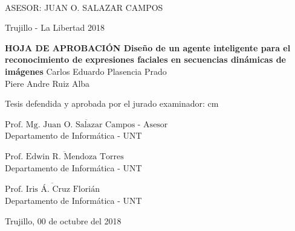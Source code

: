 \begin{center}
   {\bf {\fontsize{14}{16.8}\selectfont{CARLOS PLASENCIA PRADO}}}\\    
      {\bf {\fontsize{14}{16.8}\selectfont{PIERE RUIZ ALBA}}}       
   \end{center}   

\vskip 3.2cm
\begin{center}
   {\bf \doublespacing {\fontsize{17}{20.4}\selectfont{DISEÑO DE UN AGENTE INTELIGENTE PARA EL RECONOCIMIENTO DE EXPRESIONES FACIALES EN SECUENCIAS DINÁMICAS DE IMÁGENES}}}     
\end{center}   
  \vskip 2cm
\begin{verse}
 \fontsize{12}{14.4}
\end{verse}

\vskip 1.5cm 
{\fontsize{14}{16.8}\selectfont ASESOR: JUAN O. SALAZAR CAMPOS} 
 \vskip 1cm 
 \begin{center}    
 \vskip 1.5cm
{\fontsize{14}{16.8}\selectfont Trujillo - La Libertad
\vskip 0.1cm
\hspace*{-0.2cm} 
2018}
\end{center} 
\newpage


\begin{center}
 {\bf {\Large HOJA DE APROBACIÓN }     
 \vskip 1.5cm
  {\Large Diseño de un agente inteligente para el reconocimiento de expresiones faciales en secuencias dinámicas de imágenes}}
 \vskip 1cm 
  {\large{Carlos Eduardo Plasencia Prado}}\\
    {\large{Piere Andre Ruiz Alba}}

 \vskip 1cm
\end{center} 
Tesis defendida y aprobada por el jurado examinador:
 cm
\begin{flushleft} 
$\overline{\mbox{Prof. Mg. Juan O. Salazar Campos - Asesor}}$\\
\vskip -0.5cm
Departamento de Informática - UNT
\end{flushleft} 
\vskip 0.8cm
\begin{flushleft} 
$\overline{\mbox{Prof. Edwin R. Mendoza Torres}}$\\
\vskip -0.5cm
Departamento de Informática - UNT
\end{flushleft} 
\vskip 0.8cm
\begin{flushleft} 
$\overline{\mbox{Prof. Iris Á. Cruz Florián}}$\\
\vskip -0.5cm
Departamento de Informática - UNT
\end{flushleft}
\vskip 0.5cm 
\begin{center}    
Trujillo, 00 de octubre del 2018
\end{center} 
\newpage


